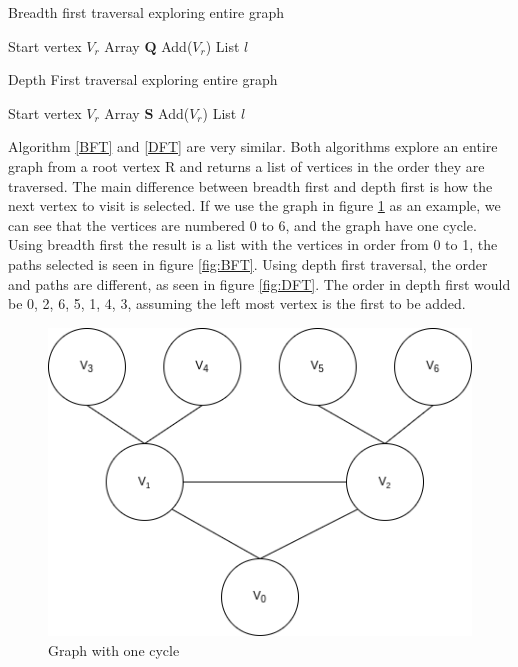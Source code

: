 \begin{algorithm}
    \caption{Breadth first traversal exploring entire graph}
    \label{BFT}
    \SetAlgoLined
    Start vertex $V_r$\; Array $\mathbf{Q}$ Add($V_r$)\; List $l$\;
    \;
\end{algorithm}

\begin{algorithm}
    \caption{Depth First traversal exploring entire graph}
    \label{DFT}
    \SetAlgoLined
    Start vertex $V_r$\; Array $\mathbf{S}$ Add($V_r$)\; List $l$\;
    \;
\end{algorithm}

Algorithm \ref{BFT} and \ref{DFT} are very similar. Both algorithms explore an entire graph from a root vertex R and returns a list of vertices in the order they are traversed. The main difference between breadth first and depth first is how the next vertex to visit is selected. If we use the graph in figure \ref{fig:graph} as an example, we can see that the vertices are numbered 0 to 6, and the graph have one cycle. Using breadth first the result is a list with the vertices in order from 0 to 1, the paths selected is seen in figure \ref{fig:BFT}. Using depth first traversal, the order and paths are different, as seen in figure \ref{fig:DFT}. The order in depth first would be 0, 2, 6, 5, 1, 4, 3, assuming the left most vertex is the first to be added.

\begin{figure}
    \centering
    \includegraphics[scale=0.5]{figs/Graph.png}
    \caption{Graph with one cycle}
    \label{fig:graph}
\end{figure}

